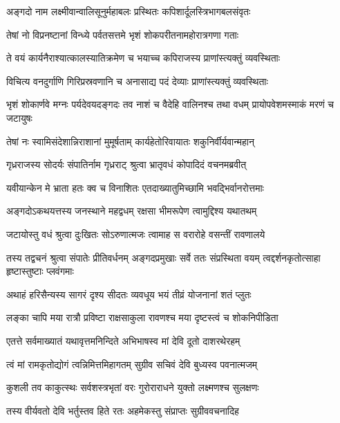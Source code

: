\twolineshloka
{अङ्गदो नाम लक्ष्मीवान्वालिसूनुर्महाबलः}
{प्रस्थितः कपिशार्दूलस्त्रिभागबलसंवृतः} %

\twolineshloka
{तेषां नो विप्रनष्टानां विन्ध्ये पर्वतसत्तमे}
{भृशं शोकपरीतनामहोरात्रगणा गताः} %

\twolineshloka
{ते वयं कार्यनैराश्यात्कालस्यातिक्रमेण च}
{भयाच्च कपिराजस्य प्राणांस्त्यक्तुं व्यवस्थिताः} %

\twolineshloka
{विचित्य वनदुर्गाणि गिरिप्रस्रवणानि च}
{अनासाद्य पदं देव्याः प्राणांस्त्यक्तुं व्यवस्थिताः} %

\threelineshloka
{भृशं शोकार्णवे मग्नः पर्यदेवयदङ्गदः}
{तव नाशं च वैदेहि वालिनश्च तथा वधम्}
{प्रायोपवेशमस्माकं मरणं च जटायुषः} %

\twolineshloka
{तेषां नः स्वामिसंदेशान्निराशानां मुमूर्षताम्}
{कार्यहेतोरिवायातः शकुनिर्वीर्यवान्महान्} %

\twolineshloka
{गृध्रराजस्य सोदर्यः संपातिर्नाम गृध्रराट्}
{श्रुत्वा भ्रातृवधं कोपादिदं वचनमब्रवीत्} %

\twolineshloka
{यवीयान्केन मे भ्राता हतः क्व च विनाशितः}
{एतदाख्यातुमिच्छामि भवद्भिर्वानरोत्तमाः} %

\twolineshloka
{अङ्गदोऽकथयत्तस्य जनस्थाने महद्वधम्}
{रक्षसा भीमरूपेण त्वामुद्दिश्य यथातथम्} %

\twolineshloka
{जटायोस्तु वधं श्रुत्वा दुःखितः सोऽरुणात्मजः}
{त्वामाह स वरारोहे वसन्तीं रावणालये} %

\threelineshloka
{तस्य तद्वचनं श्रुत्वा संपातेः प्रीतिवर्धनम्}
{अङ्गदप्रमुखाः सर्वे ततः संप्रस्थिता वयम्}
{त्वद्दर्शनकृतोत्साहा हृष्टास्तुष्टाः प्लवंगमाः} %

\twolineshloka
{अथाहं हरिसैन्यस्य सागरं दृश्य सीदतः}
{व्यवधूय भयं तीव्रं योजनानां शतं प्लुतः} %

\twolineshloka
{लङ्का चापि मया रात्रौ प्रविष्टा राक्षसाकुला}
{रावणश्च मया दृष्टस्त्वं च शोकनिपीडिता} %

\twolineshloka
{एतत्ते सर्वमाख्यातं यथावृत्तमनिन्दिते}
{अभिभाषस्व मां देवि दूतो दाशरथेरहम्} %

\twolineshloka
{त्वं मां रामकृतोद्योगं त्वन्निमित्तमिहागतम्}
{सुग्रीव सचिवं देवि बुध्यस्व पवनात्मजम्} %

\twolineshloka
{कुशली तव काकुत्स्थः सर्वशस्त्रभृतां वरः}
{गुरोराराधने युक्तो लक्ष्मणश्च सुलक्षणः} %

\twolineshloka
{तस्य वीर्यवतो देवि भर्तुस्तव हिते रतः}
{अहमेकस्तु संप्राप्तः सुग्रीववचनादिह} %

